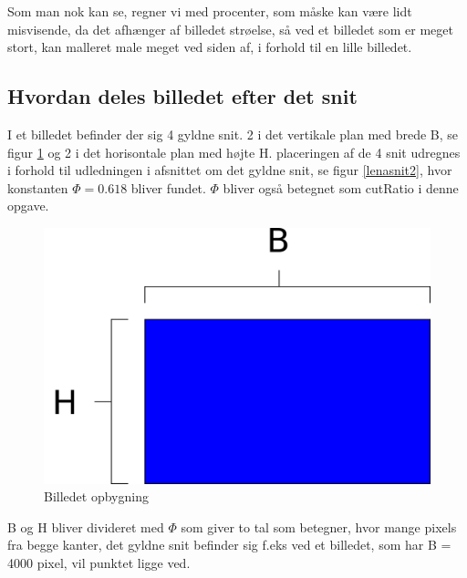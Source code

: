 Som man nok kan se, regner vi med procenter, som måske kan være lidt
misvisende, da det afhænger af billedet strøelse, så ved et billedet som
er meget stort, kan malleret male meget ved siden af, i forhold til en
lille billedet.

\subsection{Hvordan deles billedet efter det snit}
I et billedet befinder der sig 4 gyldne snit. 2 i det vertikale plan med
brede B, se figur \ref{box} og 2 i det horisontale plan med højte H.
placeringen af de 4 snit udregnes i forhold til udledningen i afsnittet
om det gyldne snit, se figur \ref{lenasnit2}, hvor konstanten $\varPhi =
0.618$ bliver fundet. $\varPhi$ bliver også betegnet som cutRatio i
denne opgave.

\begin{figure}[h]
	\begin{center}
		\includegraphics[scale=0.42,angle=0]{afsnit/vores_implementation/billeder/naiv_algoritme/path2407}
	\end{center}
	\caption[]{Billedet opbygning}
	\label{box}
\end{figure}

B og H bliver divideret med $\varPhi$ som giver to tal som betegner, hvor
mange pixels fra begge kanter, det gyldne snit befinder sig f.eks ved et
billedet, som har B = 4000 pixel, vil punktet ligge ved.

